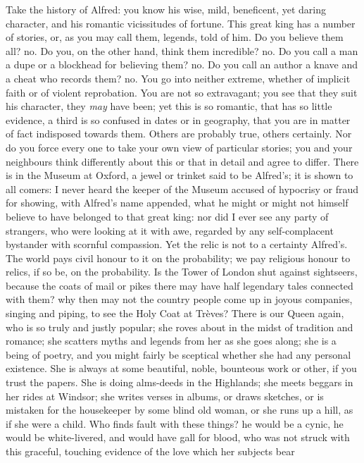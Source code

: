 Take the history of Alfred: you know his wise, mild,
beneficent, yet daring character, and his romantic
vicissitudes of fortune. This great king has a number of
stories, or, as you may call them, legends, told of him.
Do you believe them all? no. Do you, on the other hand,
think them incredible? no. Do you call a man a dupe or a
blockhead for believing them? no. Do you call an author a
knave and a cheat who records them? no. You go into
neither extreme, whether of implicit faith or of violent
reprobation. You are not so extravagant; you see that
they suit his character, they \emph{may} have been; yet
this is so romantic, that has so little evidence, a third
is so confused in dates or in geography, that you are in
matter of fact indisposed towards them. Others are
probably true, others certainly. Nor do you force every
one to take your own view of particular stories; you and
your neighbours think differently about this or that in
detail and agree to differ. There is in the Museum at
Oxford, a jewel or trinket said to be Alfred's; it is
shown to all comers: I never heard the keeper of the
Museum accused of hypocrisy or fraud for showing, with
Alfred's name appended, what he might or might not
himself believe to have belonged to that great king: nor
did I ever see any party of strangers, who were looking
at it with awe, regarded by any self-complacent bystander
with scornful compassion. Yet the relic is not to a
certainty Alfred's. The world pays civil honour to it on
the probability; we pay religious honour to relics, if so
be, on the probability. Is the Tower of London shut
against sightseers, because the coats of mail or pikes
there may have half legendary tales connected with them? why then may not the country people come up in joyous
companies, singing and piping, to see the Holy Coat at
Trèves? There is our Queen again, who is so truly and
justly popular; she roves about in the midst of tradition
and romance; she scatters myths and legends from her as
she goes along; she is a being of poetry, and you might
fairly be sceptical whether she had any personal
existence. She is always at some beautiful, noble,
bounteous work or other, if you trust the papers. She is
doing alms-deeds in the Highlands; she meets beggars in
her rides at Windsor; she writes verses in albums, or
draws sketches, or is mistaken for the housekeeper by
some blind old woman, or she runs up a hill, as if she
were a child. Who finds fault with these things? he would
be a cynic, he would be white-livered, and would have
gall for blood, who was not struck with this graceful,
touching evidence of the love which her subjects bear
